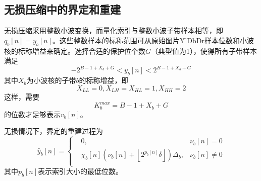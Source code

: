 \subsection{无损压缩中的界定和重建}
无损压缩采用整数小波变换，而量化索引与整数小波子带样本相等，即$q_{b}[n]=y_{b}[n]$。这些整数样本的标称范围可从原始图片Y'DbDr样本位数和小波核的标称增益来确定。选择合适的保护位个数$G$（典型值为1），使得所有子带样本满足
\begin{equation}
-2^{B-1+X_{b}+G}<y_{b}[n]<2^{B-1+X_{b}+G}
\end{equation}
其中$X_{b}$为小波核的子带$b$的标称增益，即
\begin{equation}
X_{LL}=0, X_{LH}=X_{HL}=1, X_{HH}=2
\end{equation}
这样，需要
\begin{equation}
K_{b}^{max}=B-1+X_{b}+G
\end{equation}
的位数才足够表示$v_{b}[n]$。\par
无损情况下，界定的重建过程为
\begin{equation}
\hat{y}_{b}[n]=
\left\{
\begin{aligned}
&0, &\nu_{b}[n]=0\\
&\chi_{b}[n](\nu_{b}[n]+\left\lfloor 2^{p_{b}[n]}\delta\right\rfloor)\Delta_{b}, &\nu_{b}[n]\neq 0\\
\end{aligned}
\right.
\end{equation}
其中$p_{b}[n]$表示索引大小的最低位数。